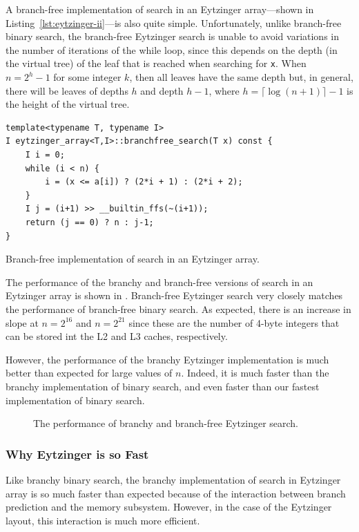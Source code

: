 \documentclass{patmorin}
\newcommand{\lstlabel}[1]{\label{lst:#1}}
\newcommand{\lstref}[1]{Listing~\ref{lst:#1}}
\begin{document}
A branch-free implementation of search in an Eytzinger array---shown
in \lstref{eytzinger-ii}---is also quite simple. Unfortunately, unlike
branch-free binary search, the branch-free Eytzinger search is unable
to avoid variations in the number of iterations of the while loop,
since this depends on the depth (in the virtual tree) of the leaf that
is reached when searching for \texttt{x}.  When $n=2^h-1$ for
some integer $k$, then all leaves have the same depth but, in general,
there will be leaves of depths $h$ and depth $h-1$, where $h=\lceil\log
(n+1)\rceil-1$ is the height of the virtual tree.

\begin{listing}
\begin{verbatim}
template<typename T, typename I>
I eytzinger_array<T,I>::branchfree_search(T x) const {
    I i = 0;
    while (i < n) {
        i = (x <= a[i]) ? (2*i + 1) : (2*i + 2);
    }
    I j = (i+1) >> __builtin_ffs(~(i+1));
    return (j == 0) ? n : j-1;
}
\end{verbatim}
\caption{Branch-free implementation of search in an Eytzinger array.}
\lstlabel{eytzinger-ii}
\end{listing}

The performance of the branchy and branch-free versions of search
in an Eytzinger array is shown in .  Branch-free
Eytzinger search very closely matches the performance of branch-free
binary search. As expected, there is an increase in slope at $n=2^{16}$
and $n=2^{21}$ since these are the number of 4-byte integers that can
be stored int the L2 and L3 caches, respectively.

However, the performance of the branchy Eytzinger implementation is
much better than expected for large values of $n$. Indeed, it is much
faster than the branchy implementation of binary search, and even
faster than our fastest implementation of binary search.

\begin{figure}
   \caption{The performance of branchy and branch-free Eytzinger search.}
\end{figure}

\subsubsection{Why Eytzinger is so Fast}

Like branchy binary search, the branchy implementation of search in
Eytzinger array is so much faster than expected because of the interaction
between branch prediction and the memory subsystem.  However, in the
case of the Eytzinger layout, this interaction is much more efficient.
\end{document}
